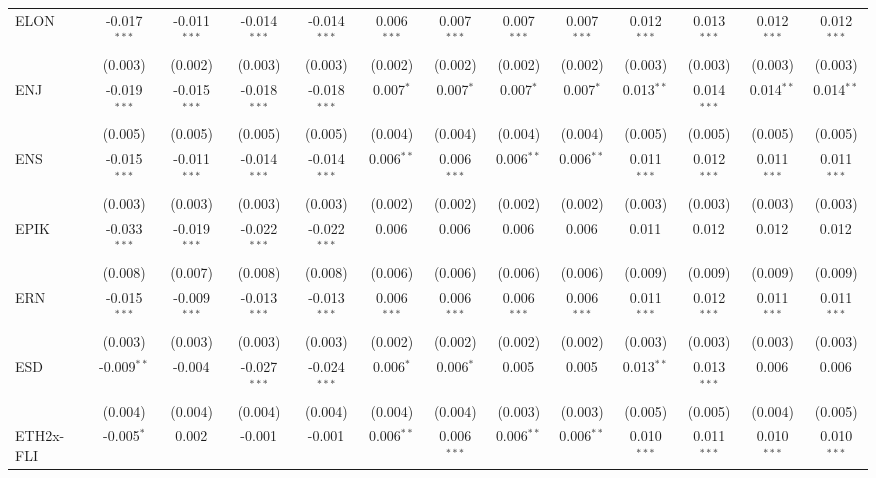 \begin{table}[!htbp]
\begin{tabular}{@{\extracolsep{5pt}}lcccccccccccc}
 ELON & -0.017$^{***}$ & -0.011$^{***}$ & -0.014$^{***}$ & -0.014$^{***}$ & 0.006$^{***}$ & 0.007$^{***}$ & 0.007$^{***}$ & 0.007$^{***}$ & 0.012$^{***}$ & 0.013$^{***}$ & 0.012$^{***}$ & 0.012$^{***}$ \\
  & (0.003) & (0.002) & (0.003) & (0.003) & (0.002) & (0.002) & (0.002) & (0.002) & (0.003) & (0.003) & (0.003) & (0.003) \\
 ENJ & -0.019$^{***}$ & -0.015$^{***}$ & -0.018$^{***}$ & -0.018$^{***}$ & 0.007$^{*}$ & 0.007$^{*}$ & 0.007$^{*}$ & 0.007$^{*}$ & 0.013$^{**}$ & 0.014$^{***}$ & 0.014$^{**}$ & 0.014$^{**}$ \\
  & (0.005) & (0.005) & (0.005) & (0.005) & (0.004) & (0.004) & (0.004) & (0.004) & (0.005) & (0.005) & (0.005) & (0.005) \\
 ENS & -0.015$^{***}$ & -0.011$^{***}$ & -0.014$^{***}$ & -0.014$^{***}$ & 0.006$^{**}$ & 0.006$^{***}$ & 0.006$^{**}$ & 0.006$^{**}$ & 0.011$^{***}$ & 0.012$^{***}$ & 0.011$^{***}$ & 0.011$^{***}$ \\
  & (0.003) & (0.003) & (0.003) & (0.003) & (0.002) & (0.002) & (0.002) & (0.002) & (0.003) & (0.003) & (0.003) & (0.003) \\
 EPIK & -0.033$^{***}$ & -0.019$^{***}$ & -0.022$^{***}$ & -0.022$^{***}$ & 0.006$^{}$ & 0.006$^{}$ & 0.006$^{}$ & 0.006$^{}$ & 0.011$^{}$ & 0.012$^{}$ & 0.012$^{}$ & 0.012$^{}$ \\
  & (0.008) & (0.007) & (0.008) & (0.008) & (0.006) & (0.006) & (0.006) & (0.006) & (0.009) & (0.009) & (0.009) & (0.009) \\
 ERN & -0.015$^{***}$ & -0.009$^{***}$ & -0.013$^{***}$ & -0.013$^{***}$ & 0.006$^{***}$ & 0.006$^{***}$ & 0.006$^{***}$ & 0.006$^{***}$ & 0.011$^{***}$ & 0.012$^{***}$ & 0.011$^{***}$ & 0.011$^{***}$ \\
  & (0.003) & (0.003) & (0.003) & (0.003) & (0.002) & (0.002) & (0.002) & (0.002) & (0.003) & (0.003) & (0.003) & (0.003) \\
 ESD & -0.009$^{**}$ & -0.004$^{}$ & -0.027$^{***}$ & -0.024$^{***}$ & 0.006$^{*}$ & 0.006$^{*}$ & 0.005$^{}$ & 0.005$^{}$ & 0.013$^{**}$ & 0.013$^{***}$ & 0.006$^{}$ & 0.006$^{}$ \\
  & (0.004) & (0.004) & (0.004) & (0.004) & (0.004) & (0.004) & (0.003) & (0.003) & (0.005) & (0.005) & (0.004) & (0.005) \\
 ETH2x-FLI & -0.005$^{*}$ & 0.002$^{}$ & -0.001$^{}$ & -0.001$^{}$ & 0.006$^{**}$ & 0.006$^{***}$ & 0.006$^{**}$ & 0.006$^{**}$ & 0.010$^{***}$ & 0.011$^{***}$ & 0.010$^{***}$ & 0.010$^{***}$ \\

\end{tabular}
\end{table}
